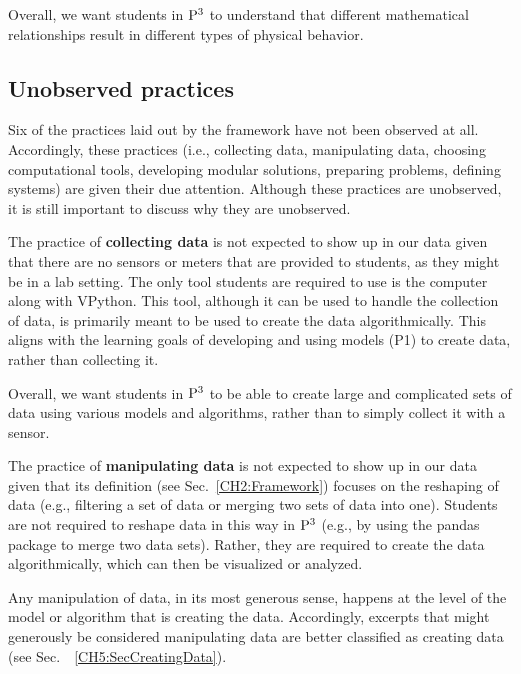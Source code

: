 \documentclass{msuphddissertation}
\begin{document}
\begin{doublespace}
Overall, we want students in ${\rm P}^{3}$ to understand that different mathematical relationships result in different types of physical behavior.



%
%
%
%
%
%
%
%
%
%
%
%
%
%
%
%

\subsection{Unobserved practices}

Six of the practices laid out by the framework have not been observed at all.  Accordingly, these practices (i.e., collecting data, manipulating data, choosing computational tools, developing modular solutions, preparing problems, defining systems) are given their due attention.  Although these practices are unobserved, it is still important to discuss why they are unobserved.

The practice of \textbf{collecting data} is not expected to show up in our data given that there are no sensors or meters that are provided to students, as they might be in a lab setting.  The only tool students are required to use is the computer along with VPython.  This tool, although it can be used to handle the collection of data, is primarily meant to be used to create the data algorithmically.  This aligns with the learning goals of developing and using models (P1) to create data, rather than collecting it.

Overall, we want students in ${\rm P}^{3}$ to be able to create large and complicated sets of data using various models and algorithms, rather than to simply collect it with a sensor.

The practice of \textbf{manipulating data} is not expected to show up in our data given that its definition (see Sec.~\ref{CH2:Framework}) focuses on the reshaping of data (e.g., filtering a set of data or merging two sets of data into one).  Students are not required to reshape data in this way in ${\rm P}^{3}$ (e.g., by using the pandas package to merge two data sets).  Rather, they are required to create the data algorithmically, which can then be visualized or analyzed.

Any manipulation of data, in its most generous sense, happens at the level of the model or algorithm that is creating the data.  Accordingly, excerpts that might generously be considered manipulating data are better classified as creating data (see Sec.~~\ref{CH5:SecCreatingData}).


\end{doublespace}
\end{document}
